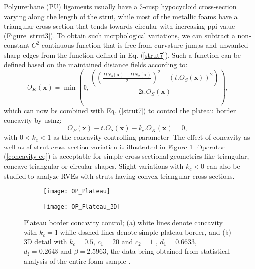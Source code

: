 Polyurethane (PU) ligaments usually have a 3-cusp hy\-po\-cy\-cloid cross-section varying along the length of the strut, while most of the metallic foams have a triangular cross-section that tends towards circular with increasing ppi value (Figure \ref{strut3}). To obtain such morphological variations, we can subtract a non-constant $ C^2 $ continuous function that is free from curvature jumps and unwanted sharp edges from the function defined in Eq. (\ref{strut7}). Such a function can be defined based on the maintained distance fields according to:
\begin{equation}
O_K(\textbf{x})=\min\left(0,\frac{{\left(\left(\frac{DN_3(\textbf{x})-DN_2(\textbf{x})}{2}\right)^2-\left(t.O_S(\textbf{x})\right)^2\right)}}{{2t.O_S(\textbf{x})}}\right)\label{plateau},
\end{equation}
which can now be combined with Eq. (\ref{strut7}) to control the plateau border concavity by using:
\begin{equation}
O_P(\textbf{x})-t.O_S(\textbf{x})-k_c.O_K(\textbf{x})=0,\label{concavity-eq}
\end{equation}
with $ 0<k_c<1 $ as the concavity controlling parameter. The effect of concavity as well as of strut cross-section variation is illustrated in Figure \ref{concavity}. {Operator (\ref{concavity-eq}) is acceptable for simple cross-sectional geometries like triangular, concave triangular or circular shapes. Slight variations with $ k_c<0 $ can also be studied to analyze RVEs with struts having convex triangular cross-sections.}

\begin{figure}
	\centering
	\begin{subfigure}[b]{0.45\textwidth}
		\texttt{[image: OP\_Plateau]}
		\caption{}
	\end{subfigure}
	\begin{subfigure}[b]{0.45\textwidth}
		\texttt{[image: OP\_Plateau\_3D]}
		\caption{}
	\end{subfigure}
	\caption{Plateau border concavity control; (a) white lines denote concavity with $ k_c=1 $ while dashed lines denote simple plateau border, and (b) 3D detail with $ k_c=0.5 $, $ c_1 = 20 $ and $ c_2=1 $ , $ d_1=0.6633 $, $ d_2=0.2648 $ and $ \beta=2.5963 $, the data being obtained from statistical analysis of the entire foam sample \cite{jangMicrostructureOpencellFoams2008}. }\label{concavity}
\end{figure}
